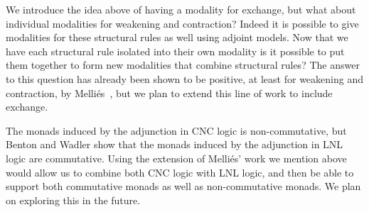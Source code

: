 We introduce the idea above of having a modality for exchange, but
what about individual modalities for weakening and contraction?
Indeed it is possible to give modalities for these structural rules as
well using adjoint models.  Now that we have each structural rule
isolated into their own modality is it possible to put them together
to form new modalities that combine structural rules?  The answer to
this question has already been shown to be positive, at least for
weakening and contraction, by Melli{\'e}s~\cite{Mellies:2004}, but we
plan to extend this line of work to include exchange.

The monads induced by the adjunction in CNC logic is non-commutative,
but Benton and Wadler show that the monads induced by the adjunction
in LNL logic \cite{Benton:1996} are commutative.  Using the extension
of Melli{\'e}s' work we mention above would allow us to combine both
CNC logic with LNL logic, and then be able to support both commutative
monads as well as non-commutative monads.  We plan on exploring this
in the future.
